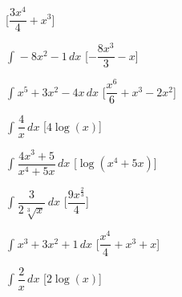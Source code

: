 \begin{esercizio}
\begin{multicols}{2}
\begin{enumeratea}
 \hfill [\(\dfrac{3 x^{4}}{4} + x^{3}\)]
\item \(\int_{}^{}- 8 x^{2} - 1\, dx\) 
 \hfill [\(- \dfrac{8 x^{3}}{3} - x\)]
\item \(\int_{}^{}x^{5} + 3 x^{2} - 4 x\, dx\) 
 \hfill [\(\dfrac{x^{6}}{6} + x^{3} - 2 x^{2}\)]
\item \(\int_{}^{}\dfrac{4}{x}\, dx\) 
 \hfill [\(4 \log{\left (x \right )}\)]
\item \(\int_{}^{}\dfrac{4 x^{3} + 5}{x^{4} + 5 x}\, dx\) 
 \hfill [\(\log{\left (x^{4} + 5 x \right )}\)]
\item \(\int_{}^{}\dfrac{3}{2 \sqrt[3]{x}}\, dx\) 
 \hfill [\(\dfrac{9 x^{\frac{2}{3}}}{4}\)]
\item \(\int_{}^{}x^{3} + 3 x^{2} + 1\, dx\) 
 \hfill [\(\dfrac{x^{4}}{4} + x^{3} + x\)]
\item \(\int_{}^{}\dfrac{2}{x}\, dx\) 
 \hfill [\(2 \log{\left (x \right )}\)]
 \end{enumeratea}
\end{multicols}
\end{esercizio}

